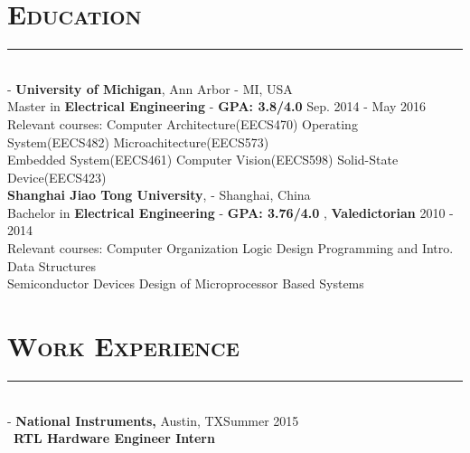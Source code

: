 \documentclass[11pt]{res}
\newcommand{\style}[1]{\color{Blue}\large\textsc{#1}}
\begin{document}
\begin{resume}
\section{\style{Education}}
\vspace{-10pt}
\rule{18cm}{0.5mm}\\
 -\sectionwidth \resumewidth
{\textbf {University of Michigan}, Ann Arbor - MI, USA \\}
{Master in \textbf{Electrical Engineering} - \textbf{GPA: 3.8/4.0}    \hfill Sep. 2014 - May 2016\hspace{-0.58in} \vspace{-0.8mm}\\}
{Relevant courses: Computer Architecture(EECS470) \hspace{0.2cm} Operating System(EECS482) \hspace{0.2cm} Microachitecture(EECS573)\\}
{\indent \hspace{2.75cm}   Embedded System(EECS461) \hspace{0.2cm} Computer Vision(EECS598) \hspace{0.2cm} Solid-State Device(EECS423) \\}
{\textbf {Shanghai Jiao Tong University},  - Shanghai, China \\}
{Bachelor in \textbf{Electrical Engineering} - \textbf{GPA: 3.76/4.0} , \textbf{Valedictorian}   \hfill 2010 - 2014\hspace{-0.58in} \vspace{-0.8mm}\\}
{Relevant courses: Computer Organization \hspace{0.3cm}  Logic Design \hspace{0.3cm}Programming and Intro. Data Structures\\}
{\indent \hspace{2.75cm}  Semiconductor Devices \hspace{0.3cm} Design of Microprocessor Based Systems\\}
  
 \vspace{-25pt}
\section{\style{Work Experience}}
\vspace{-10pt}
\rule{18cm}{0.5mm}\\
 -\sectionwidth \resumewidth
{\textbf{National Instruments,}  Austin, TX\hfill Summer 2015} \hspace{-0.58in}\vspace{-0mm}\\\
  \textbf{RTL Hardware Engineer Intern} \\
 \vspace{-14pt}


\end{resume}
\end{document}
